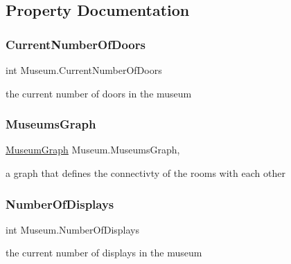 \subsection{Property Documentation}
\mbox{\label{class_museum_ab814feb2d391ec372dfc3a6c6c61c51f}} 
\subsubsection{\texorpdfstring{Current\+Number\+Of\+Doors}{CurrentNumberOfDoors}}
{\footnotesize\ttfamily int Museum.\+Current\+Number\+Of\+Doors\hspace{0.3cm}{\ttfamily [get]}}



the current number of doors in the museum 

\mbox{\label{class_museum_abdd7abe1cc5b4de86c868edb9f3ca177}} 
\subsubsection{\texorpdfstring{Museums\+Graph}{MuseumsGraph}}
{\footnotesize\ttfamily \mbox{\hyperlink{class_museum_graph}{Museum\+Graph}} Museum.\+Museums\+Graph\hspace{0.3cm}{\ttfamily [get]}, {}}



a graph that defines the connectivty of the rooms with each other 

\mbox{\label{class_museum_ac6942612f3be979812b450ee9140caf1}} 
\subsubsection{\texorpdfstring{Number\+Of\+Displays}{NumberOfDisplays}}
{\footnotesize\ttfamily int Museum.\+Number\+Of\+Displays\hspace{0.3cm}{\ttfamily [get]}}



the current number of displays in the museum 

